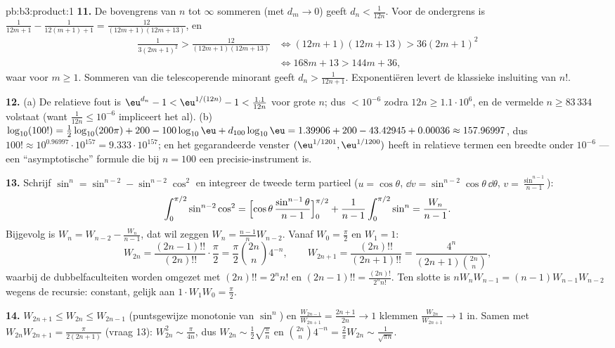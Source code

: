 \begin{solution}{pb:b3:product:1}
\textbf{11.} De bovengrens van $n$ tot $\infty$ sommeren (met
$d_m \to 0$) geeft $d_n < \frac1{12n}$. Voor de ondergrens is
$\frac1{12m+1} - \frac1{12(m+1)+1} = \frac{12}{(12m+1)(12m+13)}$,
en
\begin{align*}
\frac1{3(2m+1)^2} > \frac{12}{(12m+1)(12m+13)}
&\iff (12m+1)(12m+13) > 36(2m+1)^2 \\
&\iff 168m + 13 > 144m + 36,
\end{align*}
waar voor $m \geq 1$. Sommeren van die telescoperende minorant
geeft $d_n > \frac1{12n+1}$. Exponentiëren levert de klassieke
insluiting van $n!$.

\textbf{12.} (a) De relatieve fout is $\eu^{d_n} - 1 <
\eu^{1/(12n)} - 1 < \frac{1.1}{12n}$ voor grote $n$; dus $<
10^{-6}$ zodra $12n \geq 1.1\cdot10^6$, en de vermelde $n \geq
83\,334$ volstaat (want $\frac1{12n} \leq 10^{-6}$ impliceert het
al). (b) $\log_{10}(100!) = \frac12\log_{10}(200\pi) + 200 -
100\log_{10}\eu + d_{100}\log_{10}\eu = 1.39906 + 200 - 43.42945 +
0.00036 \approx 157.96997$, dus $100! \approx 10^{0.96997} \cdot
10^{157} = 9.333\cdot10^{157}$; en het gegarandeerde venster
$(\eu^{1/1201}, \eu^{1/1200})$ heeft in relatieve termen een
breedte onder $10^{-6}$ --- een ``asymptotische'' formule die bij
$n = 100$ een precisie-instrument is.

\textbf{13.} Schrijf $\sin^n = \sin^{n-2} - \sin^{n-2}\cos^2$ en
integreer de tweede term partieel ($u = \cos\theta$, $\dd v =
\sin^{n-2}\cos\theta\,\dd\theta$, $v = \frac{\sin^{n-1}}{n-1}$):
\[
\int_0^{\pi/2}\sin^{n-2}\cos^2 =
\Bigl[\cos\theta\,\frac{\sin^{n-1}\theta}{n-1}\Bigr]_0^{\pi/2}
+ \frac1{n-1}\int_0^{\pi/2}\sin^n = \frac{W_n}{n-1} .
\]
Bijgevolg is $W_n = W_{n-2} - \frac{W_n}{n-1}$, dat wil zeggen
$W_n = \frac{n-1}nW_{n-2}$. Vanaf $W_0 = \frac\pi2$ en $W_1 = 1$:
\[
W_{2n} = \frac{(2n-1)!!}{(2n)!!}\cdot\frac\pi2
= \frac\pi2\binom{2n}n4^{-n},
\qquad
W_{2n+1} = \frac{(2n)!!}{(2n+1)!!}
= \frac{4^n}{(2n+1)\binom{2n}n},
\]
waarbij de dubbelfaculteiten worden omgezet met $(2n)!! = 2^nn!$
en $(2n-1)!! = \frac{(2n)!}{2^nn!}$. Ten slotte is $nW_nW_{n-1} =
(n-1)W_{n-1}W_{n-2}$ wegens de recursie: constant, gelijk aan
$1\cdot W_1W_0 = \frac\pi2$.

\textbf{14.} $W_{2n+1} \leq W_{2n} \leq W_{2n-1}$ (puntsgewijze
monotonie van $\sin^n$) en $\frac{W_{2n-1}}{W_{2n+1}} =
\frac{2n+1}{2n} \to 1$ klemmen $\frac{W_{2n}}{W_{2n+1}} \to 1$ in.
Samen met $W_{2n}W_{2n+1} = \frac{\pi}{2(2n+1)}$ (vraag 13):
$W_{2n}^2 \sim \frac\pi{4n}$, dus $W_{2n} \sim
\frac12\sqrt{\frac\pi n}$ en $\binom{2n}n4^{-n} = \frac2\pi W_{2n}
\sim \frac1{\sqrt{\pi n}}$.


\end{solution}
